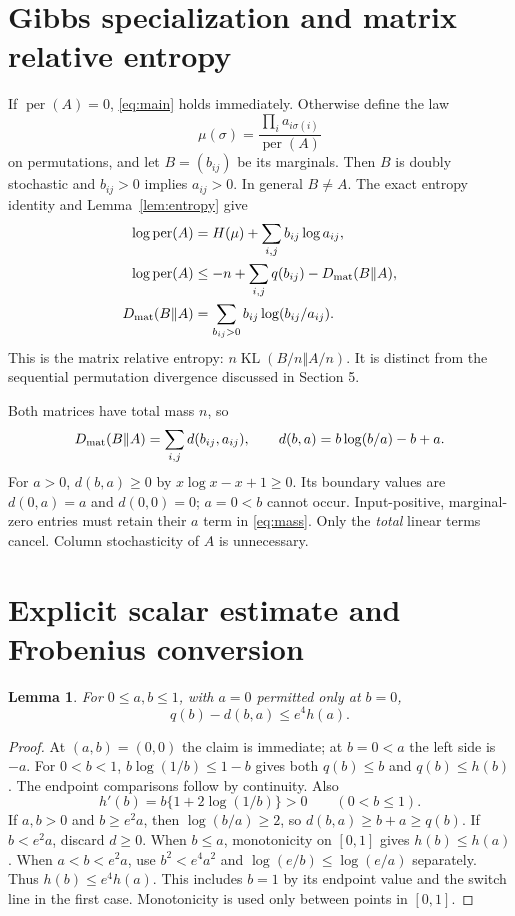\documentclass[11pt]{article}
\newtheorem{lemma}[corollary]{Lemma}
\newcommand{\per}{\operatorname{per}}
\newcommand{\KL}{\operatorname{KL}}
\begin{document}
\section{Gibbs specialization and matrix relative entropy}
If $\per(A)=0$, \eqref{eq:main} holds immediately. Otherwise define the law
\[
 \mu(\sigma)=\frac{\prod_i a_{i\sigma(i)}}{\per(A)}
\]
on permutations, and let $B=(b_{ij})$ be its marginals. Then $B$ is doubly stochastic and $b_{ij}>0$ implies $a_{ij}>0$. In general $B\ne A$. The exact entropy identity and Lemma~\ref{lem:entropy} give
\begin{align}
 \log\per(A)&=H(\mu)+\sum_{i,j}b_{ij}\log a_{ij},\nonumber\\
 \log\per(A)&\le-n+\sum_{i,j}q(b_{ij})-D_{\rm mat}(B\Vert A),\label{eq:gibbs}\\
 D_{\rm mat}(B\Vert A)&=\sum_{b_{ij}>0}b_{ij}\log(b_{ij}/a_{ij}).\nonumber
\end{align}
This is the matrix relative entropy: $n\KL(B/n\Vert A/n)$. It is distinct from the sequential permutation divergence discussed in Section 5.

Both matrices have total mass $n$, so
\begin{equation}\label{eq:mass}
 D_{\rm mat}(B\Vert A)=\sum_{i,j}d(b_{ij},a_{ij}),\qquad
 d(b,a)=b\log(b/a)-b+a.
\end{equation}
For $a>0$, $d(b,a)\ge0$ by $x\log x-x+1\ge0$. Its boundary values are $d(0,a)=a$ and $d(0,0)=0$; $a=0<b$ cannot occur. Input-positive, marginal-zero entries must retain their $a$ term in \eqref{eq:mass}. Only the \emph{total} linear terms cancel. Column stochasticity of $A$ is unnecessary.

\section{Explicit scalar estimate and Frobenius conversion}
\begin{lemma}\label{lem:scalar}
For $0\le a,b\le1$, with $a=0$ permitted only at $b=0$,
\begin{equation}\label{eq:scalar}
 q(b)-d(b,a)\le e^4h(a).
\end{equation}
\end{lemma}
\begin{proof}
At $(a,b)=(0,0)$ the claim is immediate; at $b=0<a$ the left side is $-a$. For $0<b<1$, $b\log(1/b)\le1-b$ gives both $q(b)\le b$ and $q(b)\le h(b)$. The endpoint comparisons follow by continuity. Also
\[
 h'(b)=b\{1+2\log(1/b)\}>0\qquad(0<b\le1).
\]
If $a,b>0$ and $b\ge e^2a$, then $\log(b/a)\ge2$, so $d(b,a)\ge b+a\ge q(b)$. If $b<e^2a$, discard $d\ge0$. When $b\le a$, monotonicity on $[0,1]$ gives $h(b)\le h(a)$. When $a<b<e^2a$, use $b^2<e^4a^2$ and $\log(e/b)\le\log(e/a)$ separately. Thus $h(b)\le e^4h(a)$. This includes $b=1$ by its endpoint value and the switch line in the first case. Monotonicity is used only between points in $[0,1]$.
\end{proof}
\end{document}
